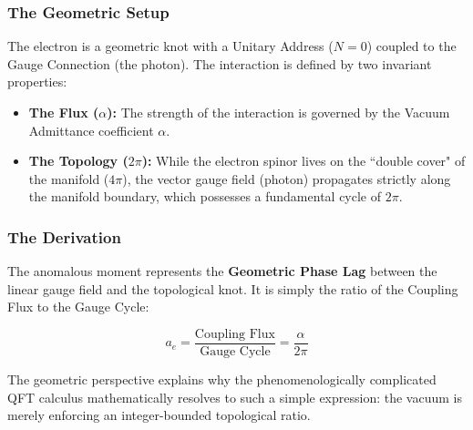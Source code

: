 \subsubsection{The Geometric Setup}

The electron is a geometric knot with a Unitary Address ($N=0$) coupled to the Gauge Connection (the photon). The interaction is defined by two invariant properties:

\begin{itemize}
    \item \textbf{The Flux ($\alpha$):} The strength of the interaction is governed by the Vacuum Admittance coefficient $\alpha$.
    \item \textbf{The Topology ($2\pi$):} While the electron spinor lives on the ``double cover" of the manifold ($4\pi$), the vector gauge field (photon) propagates strictly along the manifold boundary, which possesses a fundamental cycle of $2\pi$.
\end{itemize}

\subsubsection{The Derivation}

The anomalous moment represents the \textbf{Geometric Phase Lag} between the linear gauge field and the topological knot. It is simply the ratio of the Coupling Flux to the Gauge Cycle:

\begin{equation}
a_e = \frac{\text{Coupling Flux}}{\text{Gauge Cycle}} = \frac{\alpha}{2\pi}
\end{equation}

The geometric perspective explains why the phenomenologically complicated QFT calculus mathematically resolves to such a simple expression: the vacuum is merely enforcing an integer-bounded topological ratio.